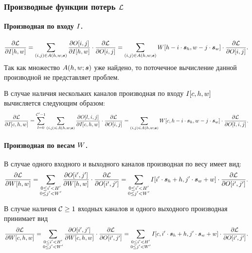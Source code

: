 \documentclass{report}
\numberwithin{theorem}{chapter}
\numberwithin{statement}{chapter}
\numberwithin{lemma}{chapter}
\theoremstyle{definition}
\numberwithin{task}{chapter}
\theoremstyle{remark}
\numberwithin{example}{chapter}
\theoremstyle{definition}
\numberwithin{definition}{chapter}
\theoremstyle{remark}
\theoremstyle{remark}
\numberwithin{lyrics}{section}
\begin{document}
\subsubsection{Производные функции потерь $\mathcal{L}$}
\paragraph{Производная по входу $I$.}
\begin{equation}
\frac{\partial \mathcal{L} }{\partial I[h, w]}= \sum\limits_{(i, j) \in A(h, w; \boldsymbol{s})} 
\frac{\partial O[i, j] }{\partial I[h, w]} \cdot \frac{\partial \mathcal{L} }{\partial O[i, j]} =
\sum\limits_{(i, j) \in A(h, w; \boldsymbol{s})} W[h - i \cdot \boldsymbol{s}_h, w - j \cdot \boldsymbol{s}_w] \cdot \frac{\partial \mathcal{L} }{\partial O[i, j]}.
\end{equation}
Так как множество $A(h, w; \boldsymbol{s})$ уже найдено, то поточечное вычисление данной производной не представляет проблем.

В случае наличия нескольких каналов производная по входу $I[c, h, w]$ вычисляется следующим образом:
\begin{equation}
\frac{\partial \mathcal{L} }{\partial I[c, h, w]}= \sum\limits_{l=0}^{\mathcal{C}' - 1}\sum\limits_{(i, j) \in A(h, w; \boldsymbol{s})} 
\frac{\partial O[l, i, j] }{\partial I[c, h, w]} \cdot \frac{\partial \mathcal{L} }{\partial O[i, j]} =
\sum\limits_{(i, j) \in A(h, w; \boldsymbol{s})} W[c, h - i \cdot \boldsymbol{s}_h, w - j \cdot \boldsymbol{s}_w] \cdot \frac{\partial \mathcal{L} }{\partial O[l, i, j]}.
\end{equation}

\paragraph{Производная по весам $W$.}
В случае одного входного и выходного каналов производная по весу имеет вид:
\begin{equation}
\frac{\partial \mathcal{L} }{\partial W[h, w]} = \sum\limits_{\substack{0 \le i' < H' \\ 0 \le j' < W'}} \frac{\partial O[i', j'] }{\partial W[h, w]} \cdot  \frac{\partial \mathcal{L} }{\partial O[i', j']} =  \sum\limits_{\substack{0 \le i' < H' \\ 0 \le j' < W'}} I[i' \cdot \boldsymbol{s}_h + h, j' \cdot \boldsymbol{s}_w + w] \cdot \frac{\partial \mathcal{L} }{\partial O[i', j']}.
\end{equation}

В случае наличия $\mathcal{C}\ge 1$ входных каналов и одного выходного производная принимает вид
\begin{equation}
\frac{\partial \mathcal{L} }{\partial W[c, h, w]} = \sum\limits_{\substack{0 \le i' < H' \\ 0 \le j' < W'}} \frac{\partial O[i', j'] }{\partial W[c, h, w]} \cdot  \frac{\partial \mathcal{L} }{\partial O[i', j']} =  \sum\limits_{\substack{0 \le i' < H' \\ 0 \le j' < W'}} I[c, i' \cdot \boldsymbol{s}_h + h, j' \cdot \boldsymbol{s}_w + w] \cdot \frac{\partial \mathcal{L} }{\partial O[i', j']}.
\end{equation}
\end{document}
